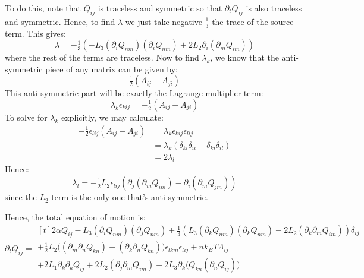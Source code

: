 \documentclass[reqno]{article}
\begin{document}
	To do this, note that $Q_{ij}$ is traceless and symmetric so that $\partial_t Q_{ij}$ is also traceless and symmetric.
	Hence, to find $\lambda$ we just take negative $\tfrac13$ the trace of the source term.
	This gives:
	\begin{equation}
		\lambda
		= -\tfrac13 \left(
		- L_3 (\partial_i Q_{nm}) (\partial_i Q_{nm})
		+ 2 L_2 \partial_i ( \partial_m Q_{im} )
		\right)
	\end{equation}
	where the rest of the terms are traceless.
	Now to find $\lambda_k$, we know that the anti-symmetric piece of any matrix can be given by:
	\begin{equation}
		\tfrac12 \left( A_{ij} - A_{ji} \right)
	\end{equation}
	This anti-symmetric part will be exactly the Lagrange multiplier term:
	\begin{equation}
		\lambda_k \epsilon_{kij} = -\tfrac12 \left( A_{ij} - A_{ji} \right)
	\end{equation}
	To solve for $\lambda_k$ explicitly, we may calculate:
	\begin{equation}
	\begin{split}
		-\tfrac12 \epsilon_{lij} \left( A_{ij} - A_{ji} \right)
		&= \lambda_k \epsilon_{kij} \epsilon_{lij} \\
		&= \lambda_k \left( \delta_{kl} \delta_{ii} - \delta_{ki} \delta_{il} \right) \\
		&= 2 \lambda_l
	\end{split}
	\end{equation}
	Hence:
	\begin{equation}
		\lambda_l = -\tfrac12 L_2 \epsilon_{lij} \left( \partial_j (\partial_m Q_{im}) - \partial_i (\partial_m Q_{jm}) \right)
	\end{equation}
	since the $L_2$ term is the only one that's anti-symmetric.
	
	Hence, the total equation of motion is:
	\begin{equation}
		\partial_t Q_{ij}
		=
		\begin{multlined}[t]
		2 \alpha Q_{ij}
		- L_3 (\partial_i Q_{nm}) (\partial_j Q_{nm}) 
		+ \tfrac13 \left( L_3 (\partial_k Q_{nm})(\partial_k Q_{nm}) 
		- 2 L_2 (\partial_k \partial_m Q_{im}) \right) \delta_{ij} \\
		+ \tfrac12 L_2 \bigl( (\partial_m \partial_n Q_{kn}) - (\partial_k \partial_n Q_{kn} ) \bigr) \epsilon_{lkm} \epsilon_{lij}
		+ n k_B T \Lambda_{ij} \\
		+ 2 L_1 \partial_k \partial_k Q_{ij} 
		+ 2 L_2 (\partial_j \partial_m Q_{im})
		+ 2 L_3 \partial_k \bigl( Q_{kn} (\partial_n Q_{ij}) \bigr)
		\end{multlined}
	\end{equation}
	
\end{document}
